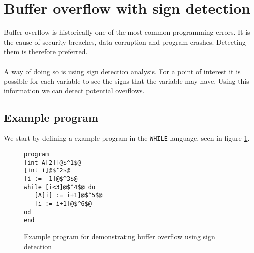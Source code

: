 \section{Buffer overflow with sign detection} \label{sec:exercise3}
Buffer overflow is historically one of the most common programming errors. It is the cause of security breaches, data corruption and program crashes. Detecting them is therefore preferred.
\\\\
A way of doing so is using sign detection analysis. For a point of interest it is possible for each variable to see the signs that the variable may have. Using this information we can detect potential overflows.

\subsection{Example program}
We start by defining a example program in the \texttt{WHILE} language, seen in figure \ref{code:array_example}.
\begin{figure}
  \begin{lstlisting}
program
[int A[2]]@$^1$@
[int i]@$^2$@
[i := -1]@$^3$@
while [i<3]@$^4$@ do
   [A[i] := i+1]@$^5$@
   [i := i+1]@$^6$@
od
end
 \end{lstlisting}
 \label{code:array_example}
 \caption{Example program for demonstrating buffer overflow using sign detection}
\end{figure}

